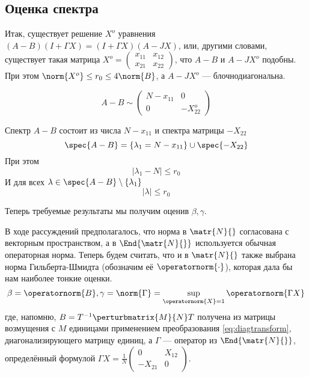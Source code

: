 \subsection{Оценка спектра}
Итак, существует решение \( X^o \) уравнения
\( (A-B)(I+\Gamma X) = (I+\Gamma X)(A-JX) \),
или, другими словами, существует такая матрица
\( X^o =
\begin{pmatrix}
    x_{11} & x_{12} \\
    x_{21} & x_{22}
\end{pmatrix}
\),
что \( A-B \) и \( A - JX^o \) подобны.
При этом \( \norm{X^o} \leq r_0 \leq 4\norm{B} \),
а \( A - JX^o \) --- блочнодиагональна.

\[
    A-B \sim
    \begin{pmatrix}
        N - x_{11} & 0 \\
        0          & -X_{22}^o
    \end{pmatrix}
    \]

\begin{propose}
    Спектр \( A - B \) состоит из числа \( N - x_{11} \)
    и спектра матрицы \( -X_{22} \)
    \[ \spec{A-B} = \{ \lambda_1 = N - x_{11} \} \cup \spec{-X_{22}} \]
    При этом
    \[ \lvert \lambda_1 - N \rvert \leq r_0 \]
    И для всех \( \lambda\in\spec{A-B}\setminus\{\lambda_1\} \)
    \[ \lvert\lambda\rvert \leq r_0 \]
\end{propose}

Теперь требуемые результаты мы получим оценив \( \beta, \gamma \).

В ходе рассуждений предполагалось, что норма в \( \matr{N}{} \)
согласована с векторным пространством,
а в \( \End{\matr{N}{}} \) используется обычная операторная норма.
Теперь будем считать, что и в \( \matr{N}{} \)
также выбрана норма Гильберта-Шмидта  (обозначим её \( \operatornorm{\cdot} \)),
которая дала бы нам наиболее тонкие оценки.
\[ \beta = \operatornorm{B}, \gamma = \norm{\Gamma} = \sup_{\operatornorm{X}=1} \operatornorm{\Gamma X} \]
где, напомню, \( B = T^{-1} \perturbmatrix{M}{N} T \)
получена из матрицы возмущения с \( M \) единицами применением преобразования \eqref{eq:diagtransform},
диагонализирующего матрицу единиц,
а \( \Gamma \) --- оператор из \( \End{\matr{N}{}} \),
определённый формулой
\( \Gamma X = \frac1N \begin{pmatrix}0 & X_{12} \\ -X_{21} & 0\end{pmatrix} \).

